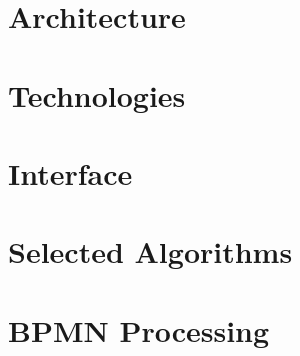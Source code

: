 \section{Architecture}
\section{Technologies}
\section{Interface}
\section{Selected Algorithms}
\section{BPMN Processing}
